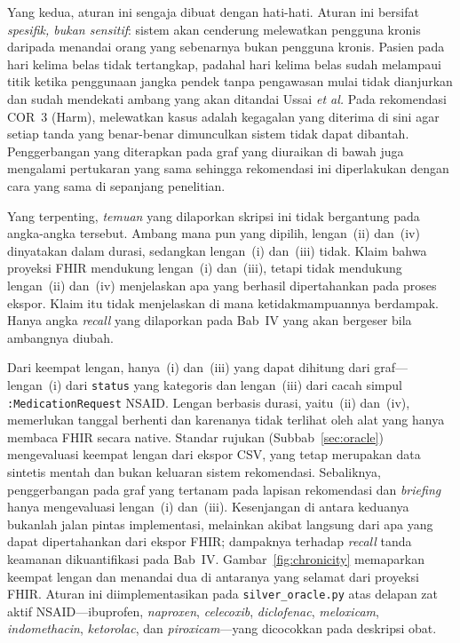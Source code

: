 Yang kedua, aturan ini sengaja dibuat dengan hati-hati. Aturan ini bersifat \emph{spesifik, bukan
sensitif}: sistem akan cenderung melewatkan pengguna kronis daripada menandai orang yang sebenarnya
bukan pengguna kronis. Pasien pada hari kelima belas tidak tertangkap, padahal hari kelima
belas sudah melampaui titik ketika penggunaan jangka pendek tanpa pengawasan mulai tidak
dianjurkan \cite{aminoshariae2016} dan sudah mendekati ambang yang akan ditandai Ussai \textit{et al.} Pada rekomendasi COR~3 (Harm), melewatkan kasus adalah kegagalan yang
diterima di sini agar setiap tanda yang benar-benar dimunculkan sistem tidak dapat dibantah.
Penggerbangan yang diterapkan pada graf yang diuraikan di bawah juga mengalami pertukaran yang sama sehingga rekomendasi
ini diperlakukan dengan cara yang sama di sepanjang penelitian.

Yang terpenting, \emph{temuan} yang dilaporkan skripsi ini tidak bergantung pada angka-angka
tersebut. Ambang mana pun yang dipilih, lengan~(ii) dan~(iv) dinyatakan dalam durasi, sedangkan
lengan~(i) dan~(iii) tidak. Klaim bahwa proyeksi FHIR mendukung lengan~(i) dan~(iii), tetapi
tidak mendukung lengan~(ii) dan~(iv) menjelaskan apa yang berhasil dipertahankan pada proses
ekspor. Klaim itu tidak menjelaskan di mana ketidakmampuannya berdampak. Hanya angka \emph{recall} yang dilaporkan pada Bab~IV yang akan
bergeser bila ambangnya diubah.

Dari keempat lengan, hanya~(i) dan~(iii) yang dapat dihitung dari graf---lengan~(i) dari
\texttt{status} yang kategoris dan lengan~(iii) dari cacah simpul
\texttt{:MedicationRequest} NSAID. Lengan berbasis durasi, yaitu~(ii) dan~(iv), memerlukan
tanggal berhenti dan karenanya tidak terlihat oleh alat yang hanya membaca FHIR secara native. Standar
rujukan (Subbab~\ref{sec:oracle}) mengevaluasi keempat lengan dari ekspor CSV, yang tetap
merupakan data sintetis mentah dan bukan keluaran sistem rekomendasi. Sebaliknya,
penggerbangan pada graf yang tertanam pada lapisan rekomendasi dan \emph{briefing} hanya
mengevaluasi lengan~(i) dan~(iii). Kesenjangan di antara keduanya bukanlah jalan pintas
implementasi, melainkan akibat langsung dari apa yang dapat dipertahankan dari ekspor FHIR; dampaknya
terhadap \emph{recall} tanda keamanan dikuantifikasi pada Bab~IV.
Gambar~\ref{fig:chronicity} memaparkan keempat lengan dan menandai dua di antaranya yang
selamat dari proyeksi FHIR. Aturan ini diimplementasikan pada
\texttt{silver\_oracle.py} atas delapan zat aktif NSAID---ibuprofen, \emph{naproxen}, \emph{celecoxib},
\emph{diclofenac}, \emph{meloxicam}, \emph{indomethacin}, \emph{ketorolac}, dan \emph{piroxicam}---yang dicocokkan pada
deskripsi obat.

